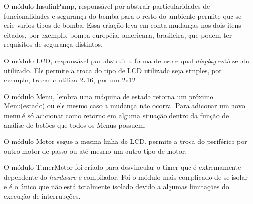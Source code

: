 O módulo InsulinPump, responsável por abstrair particularidades de funcionalidades e segurança do bomba para o resto do ambiente permite que se crie varios tipos de bomba. Essa criação leva em conta mudanças nos dois itens citados, por exemplo, bomba européia, americana, brasileira, que podem ter requisitos de segurança distintos.

O módulo LCD, responsável por abstrair a forma de uso e qual \emph{display} está sendo utilizado. Ele permite a troca do tipo de LCD utilizado seja simples, por exemplo, trocar o utiliza 2x16, por um 2x12.

O módulo Menu, lembra uma máquina de estado retorna um próximo Menu(estado) ou ele mesmo caso a mudança não ocorra. Para adiconar um novo menu é só adicionar como retorno em alguma situação dentro da função de análise de botões que todos os Menus possuem.

O módulo Motor segue a mesma linha do LCD, permite a troca do periférico por outro motor de passo ou até mesmo um outro tipo de motor.

O módulo TimerMotor foi criado para desvincular o timer que é extremamente dependente do \emph{hardware} e compilador. Foi o módulo mais complicado de se isolar e é o único que não está totalmente isolado devido a algumas limitações do execução de interrupções.